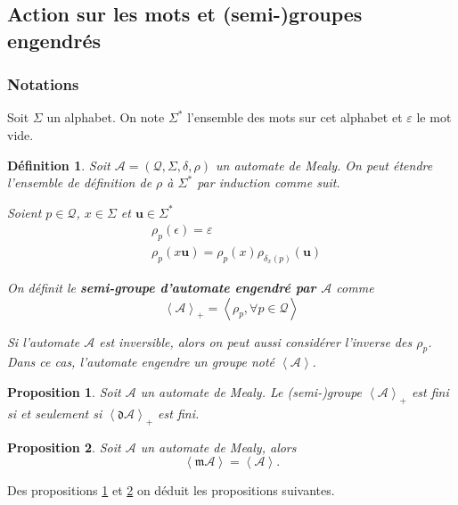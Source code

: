 \documentclass[11pt,a4paper]{article}
\newtheorem{prop}{Proposition}
\newtheorem{definition}{Définition}
\begin{document}
\subsection{Action sur les mots et (semi-)groupes engendrés\label{sec:action}}

\subsubsection*{Notations}
Soit $\Sigma$ un alphabet. On note $\Sigma^*$ l'ensemble des mots sur cet alphabet et $\varepsilon$ le mot vide.

\begin{definition}
  Soit $\mathcal{A}=\left(\mathcal{Q}, \Sigma, \delta, \rho\right)$ un automate de Mealy. On peut étendre l'ensemble de définition de $\rho$ à $\Sigma^*$ par induction comme suit.

  Soient $p\in\mathcal{Q}$, $x\in\Sigma$ et $\textbf{u}\in\Sigma^*$
  \begin{align*}
    &\rho_p(\epsilon)=\varepsilon \\
    &\rho_p(x\textbf{u})=\rho_p(x)\rho_{\delta_x(p)}(\textbf{u})
  \end{align*}

  On définit le \textbf{semi-groupe d'automate engendré par $\mathcal{A}$} comme
  \begin{equation*}
    \left<\mathcal{A}\right>_+=\left<\rho_p, \forall p\in\mathcal{Q}\right>
  \end{equation*}

  Si l'automate $\mathcal{A}$ est inversible, alors on peut aussi considérer l'inverse des $\rho_p$. Dans ce cas, l'automate engendre un groupe noté $\left<\mathcal{A}\right>$.

\end{definition}

\begin{prop}{\cite{DBLP:journals/corr/abs-1105-4725}}
  \label{prop:finitude-d}
  Soit $\mathcal{A}$ un automate de Mealy. Le (semi-)groupe $\left<\mathcal{A}\right>_+$ est fini si et seulement si $\left<\mathfrak{d}\mathcal{A}\right>_+$ est fini.
\end{prop}

\begin{prop}
  \label{prop:finitude-m}
  Soit $\mathcal{A}$ un automate de Mealy, alors
  \[ \left<\mathfrak{m}\mathcal{A}\right> = \left<\mathcal{A}\right>. \]
\end{prop}

Des propositions \ref{prop:finitude-d} et \ref{prop:finitude-m} on déduit les propositions suivantes.
\end{document}
